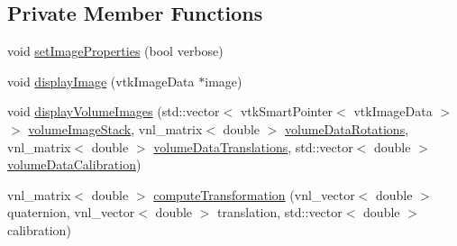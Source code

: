 \subsection*{Private Member Functions}
\begin{DoxyCompactItemize}
\item 
void \hyperlink{class_q_v_t_k_image_widget_a148e0e9402c79f81afd1079754aec7d2}{set\-Image\-Properties} (bool verbose)
\item 
void \hyperlink{class_q_v_t_k_image_widget_a48d0dad3ffc56126e2f3cbf14ee0fe98}{display\-Image} (vtk\-Image\-Data $\ast$image)
\item 
void \hyperlink{class_q_v_t_k_image_widget_a0078c9008605b2123ef6e99a71db4cd3}{display\-Volume\-Images} (std\-::vector$<$ vtk\-Smart\-Pointer$<$ vtk\-Image\-Data $>$ $>$ \hyperlink{class_q_v_t_k_image_widget_a2b96df48cde8c89ddb4a2a76c0b619c3}{volume\-Image\-Stack}, vnl\-\_\-matrix$<$ double $>$ \hyperlink{class_q_v_t_k_image_widget_ab9aba72f9fc8e922555b96f30bd1dba3}{volume\-Data\-Rotations}, vnl\-\_\-matrix$<$ double $>$ \hyperlink{class_q_v_t_k_image_widget_a039e71a63cbbba8d95894df141fa6986}{volume\-Data\-Translations}, std\-::vector$<$ double $>$ \hyperlink{class_q_v_t_k_image_widget_ad5069809b7e74c437884499f2aaaf0a0}{volume\-Data\-Calibration})
\item 
vnl\-\_\-matrix$<$ double $>$ \hyperlink{class_q_v_t_k_image_widget_a018d108cf5dbc574dcecf78fe6904a8d}{compute\-Transformation} (vnl\-\_\-vector$<$ double $>$ quaternion, vnl\-\_\-vector$<$ double $>$ translation, std\-::vector$<$ double $>$ calibration)
\end{DoxyCompactItemize}
